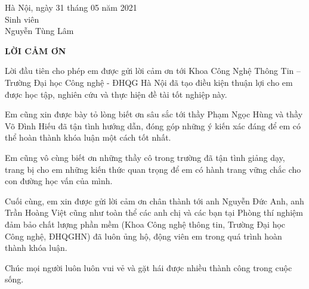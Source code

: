 \begin{flushright}
	\begin{varwidth}{\linewidth}\centering
		Hà Nội, ngày 31 tháng 05 năm 2021\\
		Sinh viên\\[2cm]
		Nguyễn Tùng Lâm
	\end{varwidth}
\end{flushright}

\newpage

\begin{center}
    \textbf{LỜI CẢM ƠN}
\end{center}

Lời đầu tiên cho phép em được gửi lời cảm ơn tới Khoa Công Nghệ Thông Tin – Trường Đại học Công nghệ - ĐHQG Hà Nội đã tạo điều kiện thuận lợi cho em được học tập, nghiên cứu và thực hiện đề tài tốt nghiệp này.

Em cũng xin được bày tỏ lòng biết ơn sâu sắc tới thầy Phạm Ngọc Hùng và thầy Võ Đình Hiếu đã tận tình hướng dẫn, đóng góp những ý kiến xác đáng để em có thể hoàn thành khóa luận một cách tốt nhất.

Em cũng vô cùng biết ơn những thầy cô trong trường đã tận tình giảng dạy, trang bị cho em những kiến thức quan trọng để em có hành trang vững chắc cho con đường học vấn của mình.

Cuối cùng, em xin được gửi lời cảm ơn chân thành tới anh Nguyễn Đức Anh, anh Trần Hoàng Việt cũng như toàn thể các anh chị và các bạn tại Phòng thí nghiệm đảm bảo chất lượng phần mềm (Khoa Công nghệ thông tin, Trường Đại học Công nghệ, ĐHQGHN) đã luôn ủng hộ, động viên em trong quá trình hoàn thành khóa luận.

Chúc mọi người luôn luôn vui vẻ và gặt hái được nhiều thành công trong cuộc sống.

